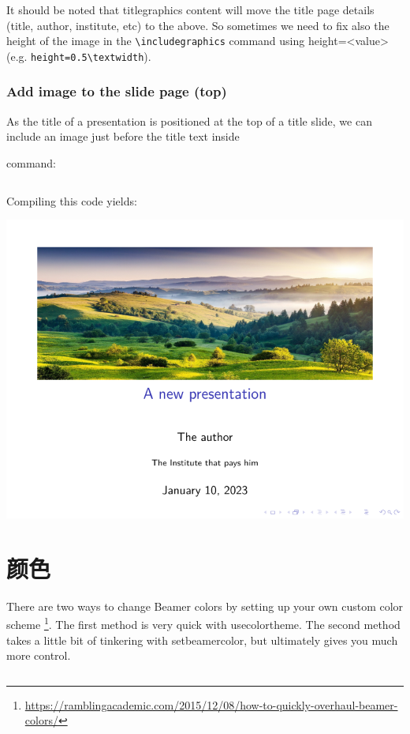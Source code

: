 \begin{column}{0.5\textwidth}
It should be noted that titlegraphics content will move the title page details (title, author, institute, etc) to the above. So sometimes we need to fix also the height of the image in the \verb|\includegraphics| command using height=<value> (e.g. \verb|height=0.5\textwidth|).

\subsubsection{Add image to the slide page (top)}

As the title of a presentation is positioned at the top of a title slide, we can include an image just before the title text inside \title{} command:

\inputminted[linenos=true]{latex}{examples/beamer/figure-titlepage1.tex}

Compiling this code yields:

\includegraphics{examples/beamer/figure-titlepage2.pdf}

\section{颜色}

There are two ways to change Beamer colors by setting up your own custom color scheme
\footnote{\url{https://ramblingacademic.com/2015/12/08/how-to-quickly-overhaul-beamer-colors/}}. 
The first method is very quick with {\ttfamily usecolortheme}. 
The second method takes a little bit of tinkering with {\ttfamily setbeamercolor}, but ultimately gives you much more control.


\end{column}
